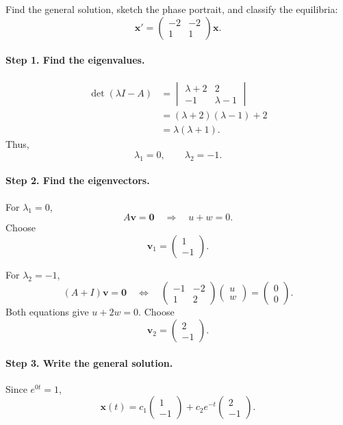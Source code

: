 \documentclass[10pt,letterpaper]{article}
\begin{document}
\begin{example}[5]{
Find the general solution, sketch the phase portrait,
and classify the equilibria:
\[
\mathbf{x}'=
\begin{pmatrix}
-2&-2\\
1&1
\end{pmatrix}\mathbf{x}.
\]
}

\paragraph{Step 1. Find the eigenvalues.}
\begin{align*}
\det(\lambda I-A)
&=
\begin{vmatrix}
\lambda+2&2\\
-1&\lambda-1
\end{vmatrix}\\
&=(\lambda+2)(\lambda-1)+2\\
&=\lambda(\lambda+1).
\end{align*}
Thus,
\[
\lambda_1=0,\qquad \lambda_2=-1.
\]

\paragraph{Step 2. Find the eigenvectors.}
For $\lambda_1=0$,
\[
A\mathbf{v}=\mathbf{0}
\quad\Longrightarrow\quad
u+w=0.
\]
Choose
\[
\mathbf{v}_1=\begin{pmatrix}1\\-1\end{pmatrix}.
\]

For $\lambda_2=-1$,
\[
(A+I)\mathbf{v}=\mathbf{0}
\quad\Longleftrightarrow\quad
\begin{pmatrix}
-1&-2\\
1&2
\end{pmatrix}
\begin{pmatrix}u\\w\end{pmatrix}
=\begin{pmatrix}0\\0\end{pmatrix}.
\]
Both equations give $u+2w=0$. Choose
\[
\mathbf{v}_2=\begin{pmatrix}2\\-1\end{pmatrix}.
\]

\paragraph{Step 3. Write the general solution.}
Since $e^{0t}=1$,
\[
\boxed{
\mathbf{x}(t)
=c_1\begin{pmatrix}1\\-1\end{pmatrix}
+c_2e^{-t}\begin{pmatrix}2\\-1\end{pmatrix}.
}
\]


\end{example}
\end{document}
